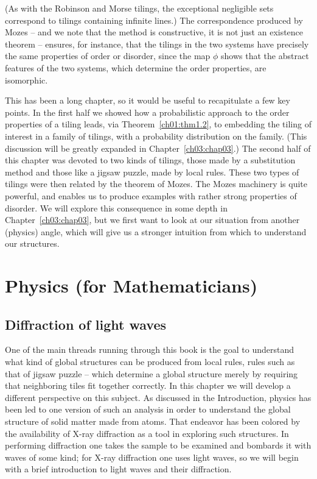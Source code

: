 \documentclass[reqno]{stml-l}
\theoremstyle{plain}
\theoremstyle{definition}
\numberwithin{equation}{chapter}
\begin{document}
(As with the Robinson and Morse tilings, the exceptional negligible sets correspond to tilings containing infinite lines.) The correspondence produced by Mozes -- and we note that the method is constructive, it is not just an existence theorem -- ensures, for instance, that the tilings in the two systems have precisely the same properties of order or disorder, since the map $\phi$ shows that the abstract features of the two systems, which determine the order properties, are isomorphic.

This has been a long chapter, so it would be useful to recapitulate a few key points. In the first half we showed how a probabilistic approach to the order properties of a tiling leads, via Theorem~\ref{ch01:thm1.2}, to embedding the tiling of interest in a family of tilings, with a probability distribution on the family. (This discussion will be greatly
expanded in Chapter~\ref{ch03:chap03}.) The second half of this chapter was devoted to two kinds of tilings, those made by a substitution method and those like a jigsaw puzzle, made by local rules. These two types of tilings were then related by the theorem of Mozes. The Mozes machinery is quite powerful, and enables us to produce examples with rather strong properties of disorder. We will explore this consequence in some depth in Chapter~\ref{ch03:chap03}, but we first want to look at our situation from another (physics) angle, which will give us a stronger intuition from which to understand our structures.

\chapter{Physics (for Mathematicians)}\label{ch02:chap02}

\section{Diffraction of light waves}\label{ch02:sec1}

One of the main threads running through this book is the goal to understand what kind of global structures can be produced from local rules, rules such as that of jigsaw puzzle -- which determine a global structure merely by requiring that neighboring tiles fit together correctly. In this chapter we will develop a different perspective on this subject. As discussed in the Introduction, physics has been led to one version of such an analysis in order to understand the global structure of solid matter made from atoms. That endeavor has been colored by the availability of X-ray diffraction as a tool in exploring such structures. In performing diffraction one takes the sample to be examined and bombards it with waves of some kind; for X-ray diffraction one uses light waves, so we will begin with a brief introduction to light waves and their diffraction.
\end{document}
